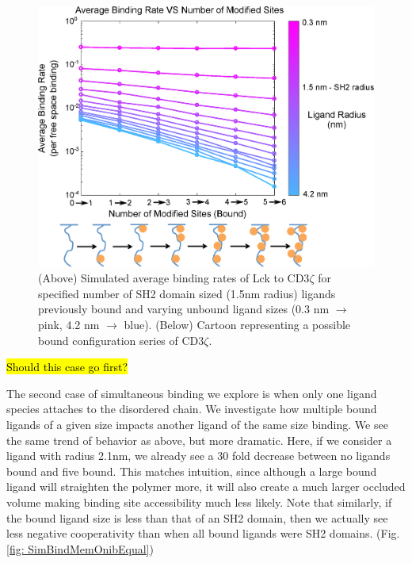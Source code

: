 \documentclass[../../AdvancementSummary.tex]{subfiles}
\begin{document}
\begin{figure}[H]
	\begin{center}
		\includegraphics[width=\linewidth]{ResultsFigures/CD3ZetaMultipleBindingMembraneOn/AvgBindVSTotalPhosColorMapLabeled.eps}
		\caption{(Above) Simulated average binding rates of Lck to CD3$\zeta$ for specified number of SH2 domain sized (1.5nm radius) ligands previously bound and varying unbound ligand sizes (0.3 nm $\rightarrow$ pink, 4.2 nm $	\rightarrow$ blue). (Below) Cartoon representing a possible bound configuration series of CD3$\zeta$. \label{fig: SimBindMemOnSH2} }
	\end{center}
\end{figure}


\hl{Should this case go first?}

The second case of simultaneous binding we explore is when only one ligand species attaches to the disordered chain. We investigate how multiple bound ligands of a given size impacts another ligand of the same size binding. We see the same trend of behavior as above, but more dramatic.  Here, if we consider a ligand with radius 2.1nm, we already see a 30 fold decrease between no ligands bound and five bound. This matches intuition, since although a large bound ligand will straighten the polymer more, it will also create a much larger occluded volume making binding site accessibility much less likely.  Note that similarly, if the bound ligand size is less than that of an SH2 domain, then we actually see less negative cooperativity than when all bound ligands were SH2 domains. (Fig. \ref{fig: SimBindMemOnibEqual})
\end{document}
